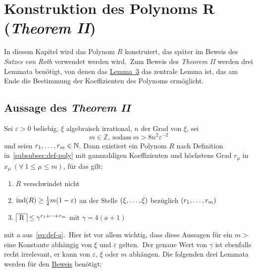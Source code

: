 
\section{Konstruktion des Polynoms R (\emph{Theorem II})}
    \label{sec:th2}
    \textrm{In diesem Kapitel wird das Polynom $R$ konstruiert, das später im Beweis des \emph{Satzes von Roth}
    verwendet werden wird.\ Zum Beweis des \emph{Theorem II} werden drei Lemmata benötigt, von denen das \hyperref
    [subsec:lemma3]{Lemma~3} das zentrale Lemma ist, das am Ende die Bestimmung der Koeffizienten des Polynoms
    ermöglicht.}
    
    \subsection{Aussage des \emph{Theorem II}}
        \label{subsec:th2}
        Sei $\varepsilon > 0$ beliebig, $\xi$ algebraisch irrational, $n$ der Grad von $\xi$, sei
        \begin{equation}
            m \in \mathbb{Z} \text{, sodass} \  m > 8 n^2 \varepsilon^{-2} \label{eq:def-m}
        \end{equation}
        \textrm{und seien $r_1, \dots, r_m \in \mathbb{N}$.
        \newline
        Dann existiert ein Polynom $R$ nach Definition in~\ref{subsubsec:def-poly} mit ganzzahligen Koeffizienten und
        höchstens Grad $r_\mu$ in $x_\mu \ (\forall \ 1 \leq \mu \leq m)$, für das gilt:}
        \begin{enumerate}
            \item $R$ verschwindet nicht \label{st:R-st}
            \item \textrm{$\operatorname{ind}(R) \geq \frac{1}{2} m (1 - \varepsilon)$ an der Stelle $(\xi, \dots, \xi)$ bezüglich
                $(r_1, \dots, r_m)$} \label{st:ind-st}
            \item $\content{R} \leq \gamma^{\dsum{r_1}{r_m}}$ mit $\gamma = 4 (a + 1)$ \label{st:cont-st}
        \end{enumerate}
        \textrm{mit a aus~\eqref{eq:def-a}.\ Hier ist vor allem wichtig, dass diese Aussagen für ein $m >$ eine Konstante
        abhängig von $\xi$ und $\varepsilon$ gelten.\ Der genaue Wert von $\gamma$ ist ebenfalls recht irrelevant, er
        kann von $\varepsilon$, $\xi$ oder $m$ abhängen.}
        \newline \newline
        \textrm{Die folgenden drei Lemmata werden für den \hyperref[subsec:proof-th2]{Beweis} benötigt:}
    

